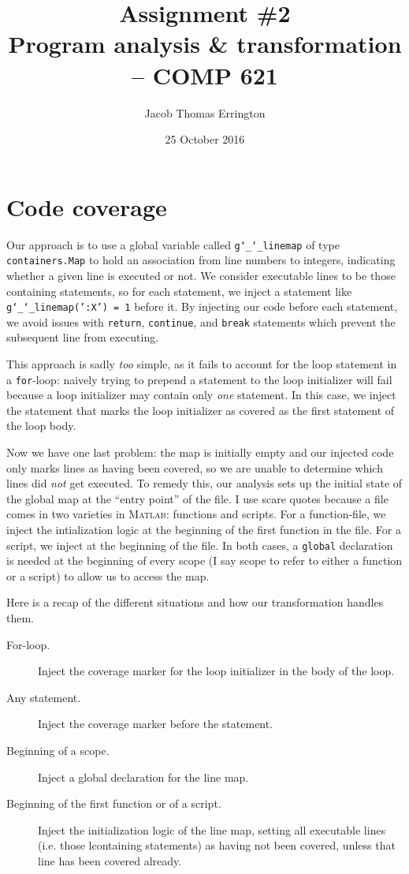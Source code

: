 \documentclass[letterpaper,11pt]{article}
\author{Jacob Thomas Errington}
\title{Assignment \#2\\Program analysis \& transformation -- COMP 621}
\date{25 October 2016}
\newcommand{\matlab}{\textsc{Matlab}}
\begin{document}
\maketitle

\section{Code coverage}

Our approach is to use a global variable called
\texttt{g\char`_\char`_linemap} of type \texttt{containers.Map} to hold an
association from line numbers to integers, indicating whether a given line is
executed or not. We consider executable lines to be those containing
statements, so for each statement, we inject a statement like
\texttt{g\char`_\char`_linemap(':X') = 1} before it. By injecting our code
before each statement, we avoid issues with \texttt{return}, \texttt{continue},
and \texttt{break} statements which prevent the subsequent line from executing.

This approach is sadly \emph{too} simple, as it fails to account for the loop
statement in a \texttt{for}-loop: naively trying to prepend a statement to the
loop initializer will fail because a loop initializer may contain only
\emph{one} statement. In this case, we inject the statement that marks the loop
initializer as covered as the first statement of the loop body.

Now we have one last problem: the map is initially empty and our injected code
only marks lines as having been covered, so we are unable to determine which
lines did \emph{not} get executed. To remedy this, our analysis sets up the
initial state of the global map at the ``entry point'' of the file. I use scare
quotes because a file comes in two varieties in \matlab{}: functions and
scripts. For a function-file, we inject the intialization logic at the
beginning of the first function in the file. For a script, we inject at the
beginning of the file. In both cases, a \texttt{global} declaration is needed
at the beginning of every scope (I say scope to refer to either a function or a
script) to allow us to access the map.

Here is a recap of the different situations and how our transformation handles
them.
\begin{description}
    \item[For-loop.]
        Inject the coverage marker for the loop initializer in the body of the
        loop.

    \item[Any statement.]
        Inject the coverage marker before the statement.

    \item[Beginning of a scope.]
        Inject a global declaration for the line map.

    \item[Beginning of the first function or of a script.]
        Inject the initialization logic of the line map, setting all executable
        lines (i.e. those lcontaining statements) as having not been covered,
        unless that line has been covered already.
\end{description}
\end{document}

